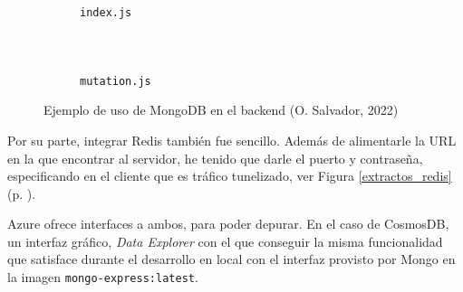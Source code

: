 \documentclass[11pt]{article}
\begin{document}
\begin{flushleft}
		\begin{figure}[htb]
			\centering
			\hspace{.5cm}
			\begin{subfigure}{0.4\textwidth}
				\inputminted[fontsize=\scriptsize, firstline=47, lastline=47, linenos, frame=single, breaklines]{javascript}{../../backend/src/index.js}
				\vspace{-.6cm}
				\inputminted[fontsize=\scriptsize, firstline=54, lastline=54, linenos, frame=single, breaklines]{javascript}{../../backend/src/index.js}
				\vspace{-.6cm}
				\inputminted[fontsize=\scriptsize, firstline=67, lastline=67, linenos, frame=single, breaklines, gobble=6]{javascript}{../../backend/src/index.js}
				\vspace{-.6cm}
				\inputminted[fontsize=\scriptsize, firstline=84, lastline=84, linenos, frame=single, breaklines, gobble=6]{javascript}{../../backend/src/index.js}
				\caption{\texttt{index.js}}	
			\end{subfigure}
			\hspace{1.3cm}
			\begin{subfigure}{0.45\textwidth}
				\inputminted[fontsize=\scriptsize, firstline=57, lastline=57, linenos, frame=single, breaklines, gobble=3]{javascript}{../../backend/src/resolvers/mutation.js}
				\vspace{-.6cm}
				\inputminted[fontsize=\scriptsize, firstline=59, lastline=59, linenos, frame=single, breaklines, gobble=5]{javascript}{../../backend/src/resolvers/mutation.js}
				\vspace{-.6cm}
				\inputminted[fontsize=\scriptsize, firstline=68, lastline=68, linenos, frame=single, breaklines, gobble=7]{javascript}{../../backend/src/resolvers/mutation.js}
				\caption{\texttt{mutation.js}}	
			\end{subfigure}
			\caption{Ejemplo de uso de MongoDB en el backend (O. Salvador, 2022)}
		\end{figure}
		
	Por su parte, integrar Redis también fue sencillo. Además de alimentarle la URL en la que encontrar al servidor, he tenido que darle el puerto y contraseña, especificando en el cliente que es tráfico tunelizado, ver Figura \ref{extractos_redis} (p. \pageref{extractos_redis}).
	\linebreak
	
	Azure ofrece interfaces a ambos, para poder depurar. En el caso de CosmosDB, un interfaz gráfico, \textit{Data Explorer} con el que conseguir la misma funcionalidad que satisface durante el desarrollo en local con el interfaz provisto por Mongo en la imagen \texttt{mongo-express:latest}.
	\linebreak
			

\end{flushleft}
\end{document}
